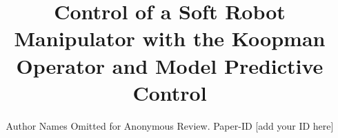\documentclass[conference]{IEEEtran}
\begin{document}
\title{Control of a Soft Robot Manipulator with the Koopman Operator and Model Predictive Control}

\author{Author Names Omitted for Anonymous Review. Paper-ID [add your ID here]}





% 


\maketitle
\end{document}

